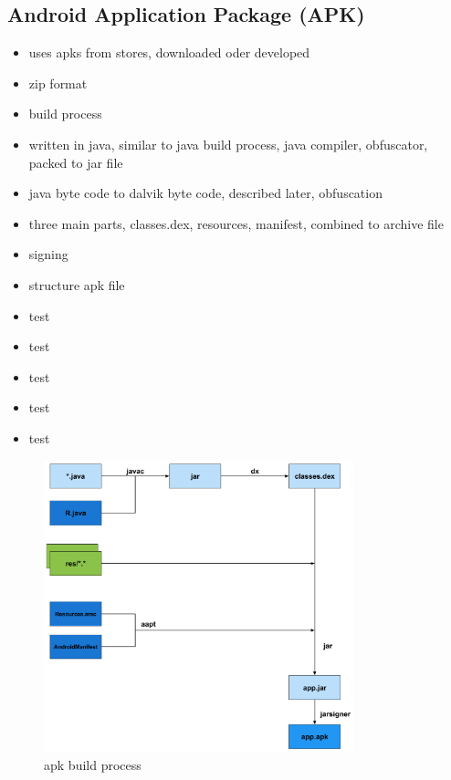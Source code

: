 \subsection{Android Application Package (APK)} \label{subsection:foundation-android-package}
\begin{itemize}
  \item uses apks from stores, downloaded oder developed
  \item zip format
  \item build process
  \item written in java, similar to java build  process, java compiler, obfuscator, packed to jar file
  \item java byte code to dalvik byte code, described later, obfuscation
  \item three main parts, classes.dex, resources, manifest, combined to archive file
  \item signing
  \item structure apk file
  \item test
  \item test
  \item test
  \item test
  \item test
\end{itemize}

\begin{figure}[h]
    \centering
    \includegraphics[width=0.8\textwidth]{data/apk.png}
    \caption{\gls{apk} build process \cite{andevconDalvikART}}
    \label{fig:apk}
\end{figure}
